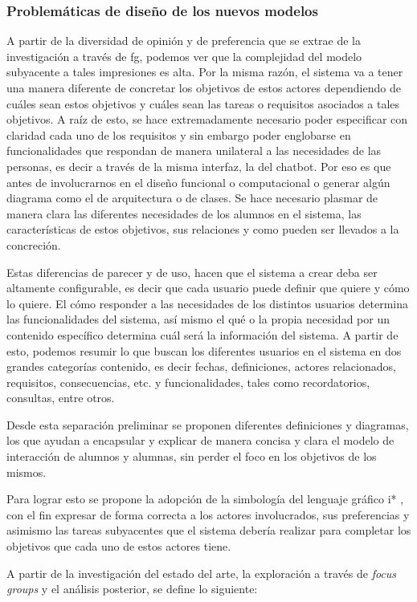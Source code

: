     \subsubsection{Problemáticas de diseño de los nuevos modelos}
    \par A partir de la diversidad de opinión y de preferencia que se extrae de la investigación a través de \acrshort{fg}, podemos ver que la complejidad del modelo subyacente a tales impresiones es alta. Por la misma razón, el sistema va a tener una manera diferente de concretar los objetivos de estos actores dependiendo de cuáles sean estos objetivos y cuáles sean las tareas o requisitos asociados a tales objetivos. A raíz de esto, se hace extremadamente necesario poder especificar con claridad cada uno de los requisitos y sin embargo poder englobarse en funcionalidades que respondan de manera unilateral a las necesidades de las personas, es decir a través de la misma interfaz, la del chatbot. Por eso es que antes de involucrarnos en el diseño funcional o computacional o generar algún diagrama como el de arquitectura o de clases. Se hace necesario plasmar de manera clara las diferentes necesidades de los alumnos en el sistema, las características de estos objetivos, sus relaciones y como pueden ser llevados a la concreción.
    
    \par Estas diferencias de parecer y de uso, hacen que el sistema a crear deba ser altamente configurable, es decir que cada usuario puede definir que quiere y cómo lo quiere. El cómo responder a las necesidades de los distintos usuarios determina las funcionalidades del sistema, así mismo el qué o la propia necesidad por un contenido específico determina cuál será la información del sistema. A partir de esto, podemos resumir lo que buscan los diferentes usuarios en el sistema en dos grandes categorías contenido, es decir fechas, definiciones, actores relacionados, requisitos, consecuencias, etc. y funcionalidades, tales como recordatorios, consultas, entre otros.
    \par Desde esta separación preliminar se proponen diferentes definiciones y diagramas, los que ayudan a encapsular y explicar de manera concisa y clara el modelo de interacción de alumnos y alumnas, sin perder el foco en los objetivos de los mismos.
    \par Para lograr esto se propone la adopción de la simbología del lenguaje gráfico \gls{i*} \cite{Dalpiaz2016}, con el fin expresar de forma correcta a los actores involucrados, sus preferencias y asimismo las tareas subyacentes que el sistema debería realizar para completar los objetivos que cada uno de estos actores tiene.
    \par A partir de la investigación del estado del arte, la exploración a través de \textit{focus groups} y el análisis posterior, se define lo siguiente:
    
